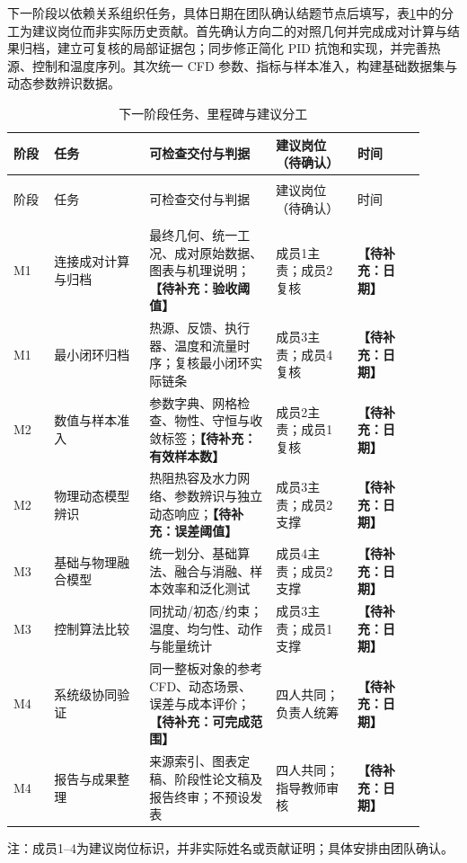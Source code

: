 \documentclass[stage2,UTF8,fontset=fandol]{ydzjreport}
\DeclareRobustCommand{\TBD}[1]{{\color{ydzjgrey}\textbf{【待补充：#1】}}}
\begin{document}
下一阶段以依赖关系组织任务，具体日期在团队确认结题节点后填写，表\ref{tab:16}中的分工为建议岗位而非实际历史贡献。首先确认方向二的对照几何并完成成对计算与结果归档，建立可复核的局部证据包；同步修正简化 PID 抗饱和实现，并完善热源、控制和温度序列。其次统一 CFD 参数、指标与样本准入，构建基础数据集与动态参数辨识数据。
\begingroup\small
\setlength{\tabcolsep}{4pt}
\begin{longtable}{>{\raggedright\arraybackslash}p{0.09\linewidth}>{\raggedright\arraybackslash}p{0.21\linewidth}>{\raggedright\arraybackslash}p{0.28\linewidth}>{\raggedright\arraybackslash}p{0.18\linewidth}>{\raggedright\arraybackslash}p{0.15\linewidth}}
\caption{下一阶段任务、里程碑与建议分工}\label{tab:16}\\
\toprule
\rowcolor{ydzjlight} 阶段 & 任务 & 可检查交付与判据 & 建议岗位（待确认） & 时间 \\\midrule
\endfirsthead
\multicolumn{5}{l}{表\thetable\ 续：下一阶段研究计划}\\
\toprule
\rowcolor{ydzjlight} 阶段 & 任务 & 可检查交付与判据 & 建议岗位（待确认） & 时间 \\\midrule
\endhead
\midrule\multicolumn{5}{r}{续下页}\\\endfoot
\bottomrule\endlastfoot
M1 & 连接成对计算与归档 & 最终几何、统一工况、成对原始数据、图表与机理说明；\TBD{验收阈值} & 成员1主责；成员2复核 & \TBD{日期}\\
M1 & 最小闭环归档 & 热源、反馈、执行器、温度和流量时序；复核最小闭环实际链条 & 成员3主责；成员4复核 & \TBD{日期}\\
M2 & 数值与样本准入 & 参数字典、网格检查、物性、守恒与收敛标签；\TBD{有效样本数} & 成员2主责；成员1复核 & \TBD{日期}\\
M2 & 物理动态模型辨识 & 热阻热容及水力网络、参数辨识与独立动态响应；\TBD{误差阈值} & 成员3主责；成员2支撑 & \TBD{日期}\\
M3 & 基础与物理融合模型 & 统一划分、基础算法、融合与消融、样本效率和泛化测试 & 成员4主责；成员2支撑 & \TBD{日期}\\
M3 & 控制算法比较 & 同扰动/初态/约束；温度、均匀性、动作与能量统计 & 成员3主责；成员1支撑 & \TBD{日期}\\
M4 & 系统级协同验证 & 同一整板对象的参考CFD、动态场景、误差与成本评价；\TBD{可完成范围} & 四人共同；负责人统筹 & \TBD{日期}\\
M4 & 报告与成果整理 & 来源索引、图表定稿、阶段性论文稿及报告终审；不预设发表 & 四人共同；指导教师审核 & \TBD{日期}\\
\end{longtable}
\endgroup
\noindent\footnotesize 注：成员1--4为建议岗位标识，并非实际姓名或贡献证明；具体安排由团队确认。\normalsize
\end{document}
